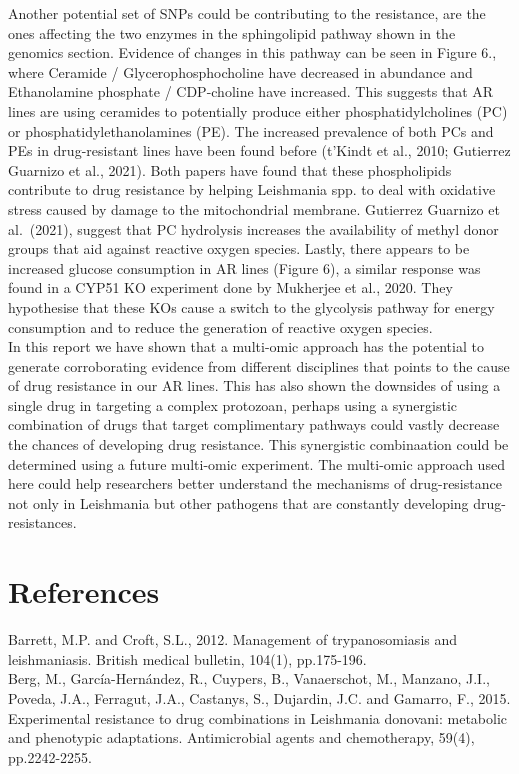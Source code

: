 \documentclass{bioinfo}
\begin{document}
Another potential set of SNPs could be contributing to the resistance,
are the ones affecting the two enzymes in the sphingolipid pathway shown
in the genomics section. Evidence of changes in this pathway can be seen
in Figure 6., where Ceramide / Glycerophosphocholine have decreased in
abundance and Ethanolamine phosphate / CDP-choline have increased. This
suggests that AR lines are using ceramides to potentially produce either
phosphatidylcholines (PC) or phosphatidylethanolamines (PE). The
increased prevalence of both PCs and PEs in drug-resistant lines have
been found before (t'Kindt et al., 2010; Gutierrez Guarnizo et al.,
2021). Both papers have found that these phospholipids contribute to
drug resistance by helping Leishmania spp. to deal with oxidative stress
caused by damage to the mitochondrial membrane. Gutierrez Guarnizo et
al.~(2021), suggest that PC hydrolysis increases the availability of
methyl donor groups that aid against reactive oxygen species. Lastly,
there appears to be increased glucose consumption in AR lines (Figure
6), a similar response was found in a CYP51 KO experiment done by
Mukherjee et al., 2020. They hypothesise that these KOs cause a switch
to the glycolysis pathway for energy consumption and to reduce the
generation of reactive oxygen species.\\

In this report we have shown that a multi-omic approach has the
potential to generate corroborating evidence from different disciplines
that points to the cause of drug resistance in our AR lines. This has
also shown the downsides of using a single drug in targeting a complex
protozoan, perhaps using a synergistic combination of drugs that target
complimentary pathways could vastly decrease the chances of developing
drug resistance. This synergistic combinaation could be determined using
a future multi-omic experiment. The multi-omic approach used here could
help researchers better understand the mechanisms of drug-resistance not
only in Leishmania but other pathogens that are constantly developing
drug-resistances.

\section{References}

Barrett, M.P. and Croft, S.L., 2012. Management of trypanosomiasis and
leishmaniasis. British medical bulletin, 104(1), pp.175-196.\\

Berg, M., García-Hernández, R., Cuypers, B., Vanaerschot, M., Manzano,
J.I., Poveda, J.A., Ferragut, J.A., Castanys, S., Dujardin, J.C. and
Gamarro, F., 2015. Experimental resistance to drug combinations in
Leishmania donovani: metabolic and phenotypic adaptations. Antimicrobial
agents and chemotherapy, 59(4), pp.2242-2255.\\
\end{document}
